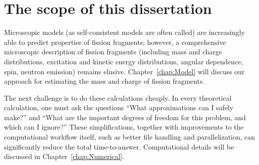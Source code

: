 \section{The scope of this dissertation}
Microscopic models (as self-consistent models are often called) are increasingly able to predict properties of fission fragments; however, a comprehensive microscopic description of fission fragments (including mass and charge distributions, excitation and kinetic energy distributions, angular dependence, spin, neutron emission) remains elusive. Chapter~\ref{chap:Model} will discuss our approach for estimating the mass and charge of fission fragments.


The next challenge is to do these calculations cheaply. In every theoretical calculation, one must ask the questions ``What approximations can I safely make?'' and ``What are the important degrees of freedom for this problem, and which can I ignore?'' These simplifications, together with improvements to the computational workflow itself, such as better file handling and parallelization, can significantly reduce the total time-to-answer. Computational details will be discussed in Chapter~\ref{chap:Numerical}.

